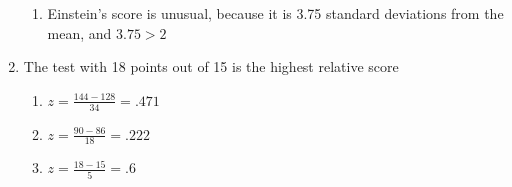 \documentclass[12pt]{article}
\begin{document}
\begin{enumerate}
\begin{enumerate}
      \item Einstein's score is unusual, because it is 3.75 standard deviations from the mean, and $3.75>2$

    \end{enumerate}

  \item The test with 18 points out of 15 is the highest relative score

    \begin{enumerate}

      \item $z=\frac{144-128}{34}=.471$

      \item $z=\frac{90-86}{18}=.222$

      \item $z=\frac{18-15}{5}=.6$

    \end{enumerate}

\end{enumerate}
\end{document}
